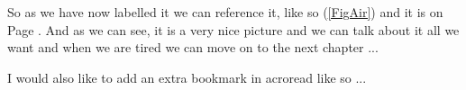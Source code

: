 
So as we have now labelled it we can reference it, like so (\ref{FigAir}) and it
is on Page \pageref{FigAir}. And as we can see, it is a very nice picture and we
can talk about it all we want and when we are tired we can move on to the next
chapter ...

I would also like to add an extra bookmark in acroread like so ...
\ifpdf
\fi

\nomenclature[gp]{$\pi$}{ $\simeq 3.14\ldots$}                                             %


